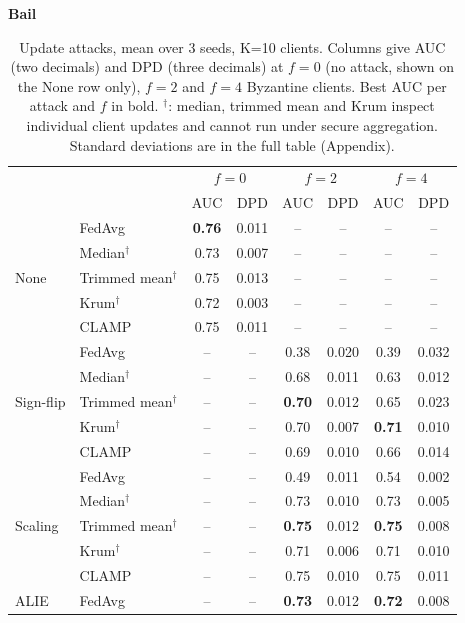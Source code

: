 \begin{table}[t]
\centering
\footnotesize
\setlength{\tabcolsep}{3pt}
\caption{Update attacks, mean over 3 seeds, K=10 clients. Columns give AUC (two decimals) and DPD (three decimals) at $f=0$ (no attack, shown on the None row only), $f=2$ and $f=4$ Byzantine clients. Best AUC per attack and $f$ in bold. $^\dagger$: median, trimmed mean and Krum inspect individual client updates and cannot run under secure aggregation. Standard deviations are in the full table (Appendix).}
\label{tab:e3}
\textbf{Bail}\\[2pt]
\begin{tabular}{llcccccc}
\toprule
 & & \multicolumn{2}{c}{$f=0$} & \multicolumn{2}{c}{$f=2$} & \multicolumn{2}{c}{$f=4$} \\
 & & AUC & DPD & AUC & DPD & AUC & DPD \\
\midrule
\multirow{5}{*}{None} & FedAvg & \textbf{0.76} & 0.011 & -- & -- & -- & -- \\
 & Median$^\dagger$ & 0.73 & 0.007 & -- & -- & -- & -- \\
 & Trimmed mean$^\dagger$ & 0.75 & 0.013 & -- & -- & -- & -- \\
 & Krum$^\dagger$ & 0.72 & 0.003 & -- & -- & -- & -- \\
 & CLAMP & 0.75 & 0.011 & -- & -- & -- & -- \\
\midrule
\multirow{5}{*}{Sign-flip} & FedAvg & -- & -- & 0.38 & 0.020 & 0.39 & 0.032 \\
 & Median$^\dagger$ & -- & -- & 0.68 & 0.011 & 0.63 & 0.012 \\
 & Trimmed mean$^\dagger$ & -- & -- & \textbf{0.70} & 0.012 & 0.65 & 0.023 \\
 & Krum$^\dagger$ & -- & -- & 0.70 & 0.007 & \textbf{0.71} & 0.010 \\
 & CLAMP & -- & -- & 0.69 & 0.010 & 0.66 & 0.014 \\
\midrule
\multirow{5}{*}{Scaling} & FedAvg & -- & -- & 0.49 & 0.011 & 0.54 & 0.002 \\
 & Median$^\dagger$ & -- & -- & 0.73 & 0.010 & 0.73 & 0.005 \\
 & Trimmed mean$^\dagger$ & -- & -- & \textbf{0.75} & 0.012 & \textbf{0.75} & 0.008 \\
 & Krum$^\dagger$ & -- & -- & 0.71 & 0.006 & 0.71 & 0.010 \\
 & CLAMP & -- & -- & 0.75 & 0.010 & 0.75 & 0.011 \\
\midrule
\multirow{5}{*}{ALIE} & FedAvg & -- & -- & \textbf{0.73} & 0.012 & \textbf{0.72} & 0.008 \\

\end{tabular}
\end{table}

